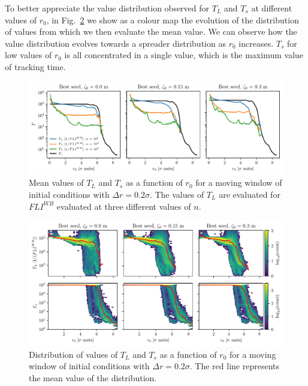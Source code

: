 To better appreciate the value distribution observed for $T_L$ and $T_s$ at different values of $r_0$, in Fig.~\ref{fig:extra_distribution} we show as a colour map the evolution of the distribution of values from which we then evaluate the mean value. We can observe how the value distribution evolves towards a spreader distribution as $r_0$ increases. $T_s$ for low values of $r_0$ is all concentrated in a single value, which is the maximum value of tracking time.   

\begin{figure}
    \centering
    \includegraphics[width=1\textwidth]{6_lhc_dynamic_indicators/figs/lyapunov_time_vs_radius.pdf}
    \caption{Mean values of $T_L$ and $T_s$ as a function of $r_0$ for a moving window of initial conditions with $\Delta r = 0.2\sigma$. The values of $T_L$ are evaluated for $FLI^{{WB}}$ evaluated at three different values of $n$.}
    \label{fig:ts_vs_tl}
\end{figure}

\begin{figure}
    \centering
    \includegraphics[width=1\textwidth]{6_lhc_dynamic_indicators/figs/dist_and_mean.pdf}
    \caption{Distribution of values of $T_L$ and $T_s$ as a function of $r_0$ for a moving window of initial conditions with $\Delta r = 0.2\sigma$. The red line represents the mean value of the distribution.}
    \label{fig:extra_distribution}
\end{figure}

